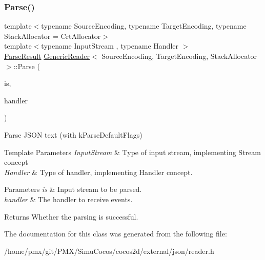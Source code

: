 \subsubsection{\texorpdfstring{Parse()}{Parse()}\hspace{0.1cm}{\footnotesize\ttfamily [4/4]}}
{\footnotesize\ttfamily template$<$typename Source\+Encoding, typename Target\+Encoding, typename Stack\+Allocator = Crt\+Allocator$>$ \\
template$<$typename Input\+Stream , typename Handler $>$ \\
\hyperlink{structParseResult}{Parse\+Result} \hyperlink{classGenericReader}{Generic\+Reader}$<$ Source\+Encoding, Target\+Encoding, Stack\+Allocator $>$\+::Parse (\begin{DoxyParamCaption}\item[{Input\+Stream \&}]{is,  }\item[{Handler \&}]{handler }\end{DoxyParamCaption})\hspace{0.3cm}{\ttfamily [inline]}}



Parse J\+S\+ON text (with k\+Parse\+Default\+Flags) 


\begin{DoxyTemplParams}{Template Parameters}
{\em Input\+Stream} & Type of input stream, implementing Stream concept \\
\hline
{\em Handler} & Type of handler, implementing Handler concept. \\
\hline
\end{DoxyTemplParams}

\begin{DoxyParams}{Parameters}
{\em is} & Input stream to be parsed. \\
\hline
{\em handler} & The handler to receive events. \\
\hline
\end{DoxyParams}
\begin{DoxyReturn}{Returns}
Whether the parsing is successful. 
\end{DoxyReturn}


The documentation for this class was generated from the following file\+:\begin{DoxyCompactItemize}
\item 
/home/pmx/git/\+P\+M\+X/\+Simu\+Cocos/cocos2d/external/json/reader.\+h\end{DoxyCompactItemize}

